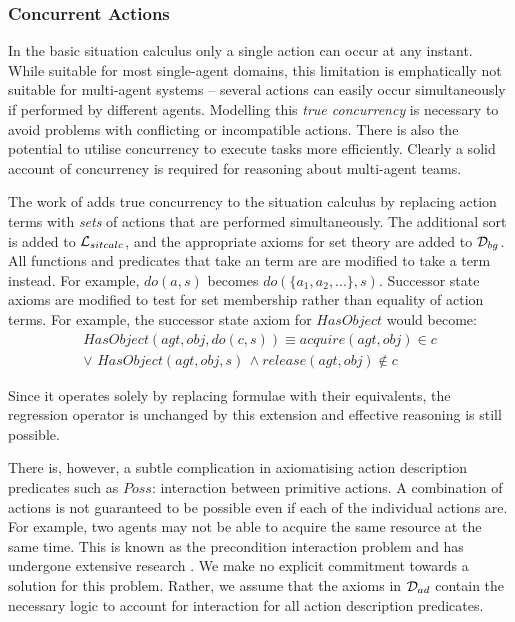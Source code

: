 \subsubsection{Concurrent Actions}

\label{sec:Background:Concurrent-Actions}

In the basic situation calculus only a single action can occur at
any instant. While suitable for most single-agent domains, this limitation
is emphatically not suitable for multi-agent systems -- several actions
can easily occur simultaneously if performed by different agents.
Modelling this \emph{true concurrency} is necessary to avoid problems
with conflicting or incompatible actions. There is also the potential
to utilise concurrency to execute tasks more efficiently. Clearly
a solid account of concurrency is required for reasoning about multi-agent
teams.

The work of \citep{lin92sc_conc,pinto94temporal,reiter96sc_nat_conc}
adds true concurrency to the situation calculus by replacing action
terms with \emph{sets} of actions that are performed simultaneously.
The additional sort  is added to $\mathcal{L}_{sitcalc}$, and the
appropriate axioms for set theory are added to $\mathcal{D}_{bg}$. All functions
and predicates that take an  term are are modified to
take a  term instead. For example, $do(a,s)$ becomes
$do(\{a_{1},a_{2},...\},s)$. Successor state axioms are modified
to test for set membership rather than equality of action terms. For
example, the successor state axiom for $HasObject$ would become:\begin{multline*}
HasObject(agt,obj,do(c,s))\equiv acquire(agt,obj)\in c\\
\vee\,\, HasObject(agt,obj,s)\,\wedge release(agt,obj)\not\in c\end{multline*}


Since it operates solely by replacing formulae with their equivalents,
the regression operator is unchanged by this extension and effective
reasoning is still possible.

There is, however, a subtle complication in axiomatising action description
predicates such as $Poss$: interaction between primitive actions.
A combination of actions is not guaranteed to be possible even if
each of the individual actions are. For example, two agents may not
be able to acquire the same resource at the same time. This is known
as the precondition interaction problem and has undergone extensive
research \citep{pinto94temporal,pinto98interacting_effects,pinto00action_interaction}.
We make no explicit commitment towards a solution for this problem.
Rather, we assume that the axioms in $\mathcal{D}_{ad}$ contain the necessary
logic to account for interaction for all action description predicates.

